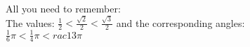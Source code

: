 \documentclass[preview]{standalone}
\begin{document}
\begin{center}
All you need to remember: \\ The values: $ \frac{1}{2} < \frac{\sqrt{2}}{2} < \frac{\sqrt{3}}{2} $ and the corresponding angles: \\ $ \frac{1}{6} \pi < \frac{1}{4} \pi < rac{1}{3} \pi $
\end{center}
\end{document}
